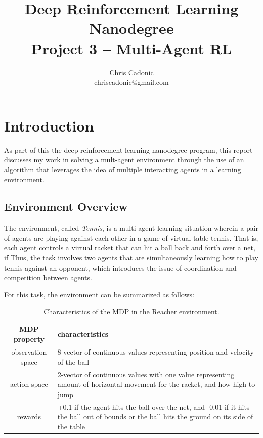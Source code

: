 \documentclass[11pt]{article}
\begin{document}
	
	\title{Deep Reinforcement Learning Nanodegree\\
		Project 3 -- Multi-Agent RL}
	\author{\vspace{-1mm}Chris Cadonic\\
		chriscadonic@gmail.com}
	\maketitle
	\vspace{-1.5em}
	
	\section{Introduction}
	
	As part of this the deep reinforcement learning nanodegree program, this report discusses my work in solving a mult-agent environment through the use of an algorithm that leverages the idea of multiple interacting agents in a learning environment.
	
	\subsection{Environment Overview}
	
	The environment, called \textit{Tennis}, is a multi-agent learning situation wherein a pair of agents are playing against each other in a game of virtual table tennis. That is, each agent controls a virtual racket that can hit a ball back and forth over a net, if Thus, the task involves two agents that are simultaneously learning how to play tennis against an opponent, which introduces the issue of coordination and competition between agents.
	
	For this task, the environment can be summarized as follows:
	
	\begin{table}[!ht]
		\centering
		\begin{tabular}{ c | p{10cm} }
			\textbf{MDP property} & \textbf{characteristics} \\
			\hline
			observation space & 8-vector of continuous values representing position and velocity of the ball \\
			\hline
			action space & 2-vector of continuous values with one value representing amount of horizontal movement for the racket, and how high to jump \\
			\hline
			rewards & +0.1 if the agent hits the ball over the net, and -0.01 if it hits the ball out of bounds or the ball hits the ground on its side of the table \\
			\hline
		\end{tabular}
		\caption{Characteristics of the MDP in the Reacher environment.}
		\label{tbl:mdp}
	\end{table}
	
\end{document}
